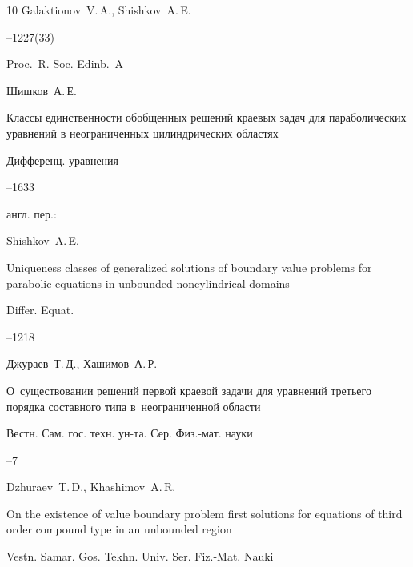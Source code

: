 \begin{thebibliography}{10}
\by Galaktionov~V.\,A., Shishkov~A.\,E.



--1227(33)

\jour Proc.~R. Soc. Edinb.~A 








\by Шишков~А.\,Е. 

\paper Классы единственности обобщенных решений краевых задач для параболических уравнений в неограниченных цилиндрических областях 

\jour Дифференц. уравнения




--1633

\transl англ. пер.:~

\by Shishkov~A.\,E. 

\paper Uniqueness classes of generalized solutions of boundary value problems for parabolic equations in unbounded noncylindrical domains

\jour Differ. Equat.




–1218






\by Джураев~Т.\,Д., Хашимов~А.\,Р. 

\paper О~существовании решений первой краевой задачи для уравнений третьего порядка составного типа в~неограниченной области

\jour Вестн. Сам. гос. техн. ун-та. Сер. Физ.-мат. науки



--7

\misctransl

\by Dzhuraev~T.\,D., Khashimov~A.\,R.

\paper On the existence of value boundary problem first solutions for equations of third order compound type in an unbounded region

\jour Vestn. Samar. Gos. Tekhn. Univ. Ser. Fiz.-Mat. Nauki


\end{thebibliography}
